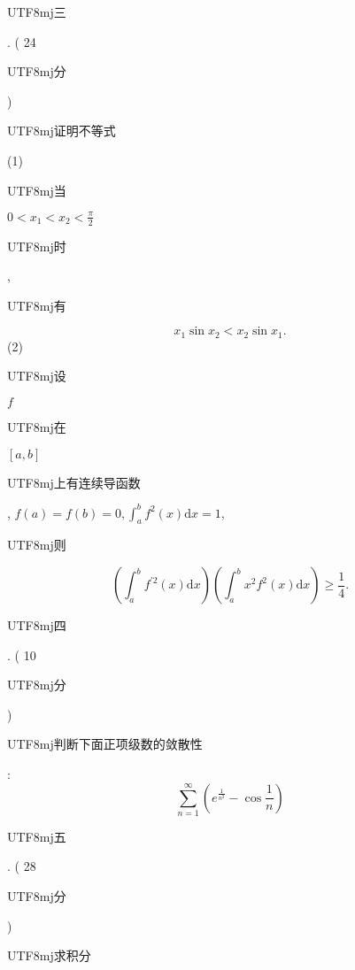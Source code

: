 \documentclass[10pt]{article}
\begin{document}
\begin{CJK}{UTF8}{mj}三\end{CJK}. ( 24 \begin{CJK}{UTF8}{mj}分\end{CJK}) \begin{CJK}{UTF8}{mj}证明不等式\end{CJK}

(1) \begin{CJK}{UTF8}{mj}当\end{CJK} $0<x_{1}<x_{2}<\frac{\pi}{2}$ \begin{CJK}{UTF8}{mj}时\end{CJK}, \begin{CJK}{UTF8}{mj}有\end{CJK}
$$
x_{1} \sin x_{2}<x_{2} \sin x_{1} .
$$
(2) \begin{CJK}{UTF8}{mj}设\end{CJK} $f$ \begin{CJK}{UTF8}{mj}在\end{CJK} $[a, b]$ \begin{CJK}{UTF8}{mj}上有连续导函数\end{CJK}, $f(a)=f(b)=0, \int_{a}^{b} f^{2}(x) \mathrm{d} x=1$, \begin{CJK}{UTF8}{mj}则\end{CJK}
$$
\left(\int_{a}^{b} f^{\prime 2}(x) \mathrm{d} x\right)\left(\int_{a}^{b} x^{2} f^{2}(x) \mathrm{d} x\right) \geqslant \frac{1}{4} .
$$
\begin{CJK}{UTF8}{mj}四\end{CJK}. ( 10 \begin{CJK}{UTF8}{mj}分\end{CJK}) \begin{CJK}{UTF8}{mj}判断下面正项级数的敛散性\end{CJK}:
$$
\sum_{n=1}^{\infty}\left(e^{\frac{1}{n^{2}}}-\cos \frac{1}{n}\right)
$$
\begin{CJK}{UTF8}{mj}五\end{CJK}. ( 28 \begin{CJK}{UTF8}{mj}分\end{CJK}) \begin{CJK}{UTF8}{mj}求积分\end{CJK}
\end{document}

